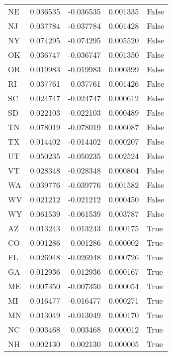 \begin{table}
\begin{tabular}{lrrrl}
      NE &   0.036535 & -0.036535 &       0.001335 &         False \\
      NJ &   0.037784 & -0.037784 &       0.001428 &         False \\
      NY &   0.074295 & -0.074295 &       0.005520 &         False \\
      OK &   0.036747 & -0.036747 &       0.001350 &         False \\
      OR &   0.019983 & -0.019983 &       0.000399 &         False \\
      RI &   0.037761 & -0.037761 &       0.001426 &         False \\
      SC &   0.024747 & -0.024747 &       0.000612 &         False \\
      SD &   0.022103 & -0.022103 &       0.000489 &         False \\
      TN &   0.078019 & -0.078019 &       0.006087 &         False \\
      TX &   0.014402 & -0.014402 &       0.000207 &         False \\
      UT &   0.050235 & -0.050235 &       0.002524 &         False \\
      VT &   0.028348 & -0.028348 &       0.000804 &         False \\
      WA &   0.039776 & -0.039776 &       0.001582 &         False \\
      WV &   0.021212 & -0.021212 &       0.000450 &         False \\
      WY &   0.061539 & -0.061539 &       0.003787 &         False \\
      AZ &   0.013243 &  0.013243 &       0.000175 &          True \\
      CO &   0.001286 &  0.001286 &       0.000002 &          True \\
      FL &   0.026948 & -0.026948 &       0.000726 &          True \\
      GA &   0.012936 &  0.012936 &       0.000167 &          True \\
      ME &   0.007350 & -0.007350 &       0.000054 &          True \\
      MI &   0.016477 & -0.016477 &       0.000271 &          True \\
      MN &   0.013049 & -0.013049 &       0.000170 &          True \\
      NC &   0.003468 &  0.003468 &       0.000012 &          True \\
      NH &   0.002130 &  0.002130 &       0.000005 &          True \\

\end{tabular}
\end{table}
